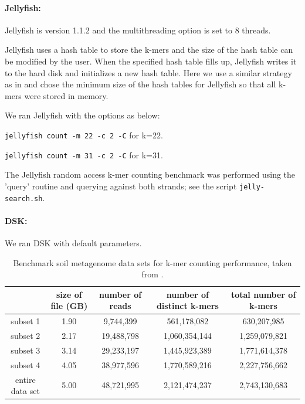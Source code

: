 \documentclass{article}
\begin{document}
\paragraph{Jellyfish:}
Jellyfish is version 1.1.2 and the multithreading option is set to 8 threads.

Jellyfish uses a hash table to store the k-mers and the size of the
hash table can be modified by the user.  When the specified hash table
fills up, Jellyfish writes it to the hard
disk and initializes a new hash table.  Here we use a
similar strategy as in \cite{Melsted2011} and chose the minimum size of the hash 
tables for Jellyfish so that all k-mers were stored in memory.

We ran Jellyfish with the options as below:

{\tt jellyfish count -m 22 -c 2 -C} for k=22.

{\tt jellyfish count -m 31 -c 2 -C} for k=31.

The Jellyfish random access k-mer counting benchmark was performed
using the 'query' routine and querying against both strands; see
the script {\tt jelly-search.sh}.

\paragraph{DSK:} We ran DSK with default parameters.



\begin{table}[ht]
    \begin{tabular}{ |c | c |c| c|c| }
      \hline                        
       & size of file (GB) & number of reads & number of distinct
      k-mers & total number of k-mers \\
      \hline
    subset 1 & 1.90 & 9,744,399 & 561,178,082 & 630,207,985
    \\
    subset 2 & 2.17 & 19,488,798 & 1,060,354,144 & 1,259,079,821
    \\ 
    subset 3 & 3.14 & 29,233,197 & 1,445,923,389 & 1,771,614,378
    \\ 
    subset 4 & 4.05 & 38,977,596 & 1,770,589,216 & 2,227,756,662
    \\ 
    entire data set & 5.00 & 48,721,995 & 2,121,474,237 & 2,743,130,683
    \\
      \hline  
    \end{tabular}
\caption{Benchmark soil metagenome data sets for k-mer counting performance, taken from
\cite{Howe2012}.}
\label{table:datasets}
\end{table}
\end{document}
